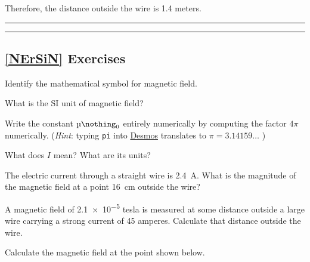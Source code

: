 \documentclass{article}
\begin{document}
Therefore, the distance outside the wire is 1.4 meters.

\vspace{1em}

\hrule\hrule

\clearpage

\subsection*{\ref{NErSiN} Exercises}

\begin{exercise}
    Identify the mathematical symbol for magnetic field.
\end{exercise}

\begin{exercise}
    What is the SI unit of magnetic field?
\end{exercise}


\begin{exercise}
    Write the constant $\mymu_0$ entirely numerically by computing the factor $4\pi$ numerically. (\textit{Hint}: typing \texttt{pi} into \href{https://www.desmos.com/scientific}{Desmos} translates to $\pi = 3.14159\ldots$ )
\end{exercise}

\begin{exercise}
    What does $I$ mean? What are its units?
\end{exercise}

\begin{exercise} \label{eibN4h}
    The electric current through a straight wire is \SI{2.4}{A}. What is the magnitude of the magnetic field at a point \SI{16}{cm} outside the wire?
\end{exercise}

\begin{exercise} \label{Z3KU8j}
    A magnetic field of \num{2.1e-5} tesla is measured at some distance outside a large wire carrying a strong current of 45 amperes. Calculate that distance outside the wire.
\end{exercise}

\begin{exercise} \label{toCeii}
    Calculate the magnetic field at the point shown below.

\begin{center}
\end{center}
\end{exercise}
\end{document}
